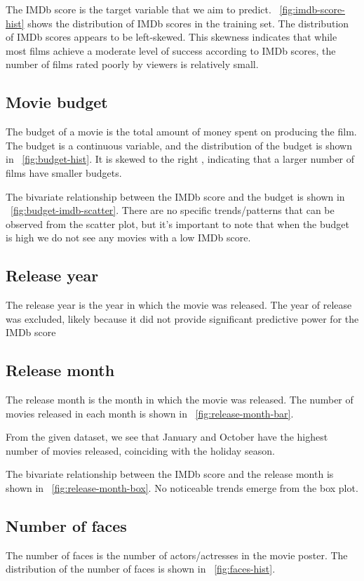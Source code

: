 \documentclass[12pt,a4paper]{article}
\begin{document}
The IMDb score is the target variable that we aim to predict.
\figurename~\ref{fig:imdb-score-hist} shows the distribution of IMDb scores in the training set.
The distribution of IMDb scores appears to be left-skewed.
This skewness indicates that while most films achieve a moderate level of success according to IMDb scores, the number of films rated poorly by viewers is relatively small.

\subsection{Movie budget}\label{subsec:budget}

The budget of a movie is the total amount of money spent on producing the film.
The budget is a continuous variable, and the distribution of the budget is shown in \figurename~\ref{fig:budget-hist}.
It is skewed to the right , indicating that a larger number of films have smaller budgets.

The bivariate relationship between the IMDb score and the budget is shown in \figurename~\ref{fig:budget-imdb-scatter}.
There are no specific trends/patterns that can be observed from the scatter plot, but it's important to note that when the budget is high we do not see any movies with a low IMDb score.

\subsection{Release year}\label{subsec:release-year}
The release year is the year in which the movie was released.
The year of release was excluded, likely because it did not provide significant predictive power for the IMDb score

\subsection{Release month}\label{subsec:release-month}
The release month is the month in which the movie was released.
The number of movies released in each month is shown in \figurename~\ref{fig:release-month-bar}.

From the given dataset, we see that January and October have the highest number of movies released, coinciding with the holiday season.

The bivariate relationship between the IMDb score and the release month is shown in \figurename~\ref{fig:release-month-box}.
No noticeable trends emerge from the box plot.


\subsection{Number of faces}\label{subsec:number-of-faces}
The number of faces is the number of actors/actresses in the movie poster.
The distribution of the number of faces is shown in \figurename~\ref{fig:faces-hist}.
\end{document}
